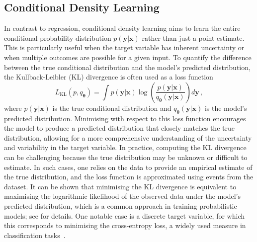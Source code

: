 \subsection{Conditional Density Learning}
\label{sec:conditional_density}
In contrast to regression, conditional density learning aims to learn the entire conditional probability distribution $p(\mathbf{y}|\mathbf{x})$ rather than just a point estimate. This is particularly useful when the target variable has inherent uncertainty or when multiple outcomes are possible for a given input. To quantify the difference between the true conditional distribution and the model's predicted distribution, the Kullback-Leibler (KL) divergence is often used as a loss function~\cite{kl_divergence}
\begin{equation}
    \label{eq:kl_divergence}
    L_{\text{KL}}(p, q_{\boldsymbol{\theta}}) = \int p(\mathbf{y}|\mathbf{x}) \log \left(\frac{p(\mathbf{y}|\mathbf{x})}{q_{\boldsymbol{\theta}}(\mathbf{y}|\mathbf{x})}\right) d\mathbf{y}\,,
\end{equation}
where $p(\mathbf{y}|\mathbf{x})$ is the true conditional distribution and $q_{\boldsymbol{\theta}}(\mathbf{y}|\mathbf{x})$ is the model's predicted distribution. Minimising with respect to this loss function encourages the model to produce a predicted distribution that closely matches the true distribution, allowing for a more comprehensive understanding of the uncertainty and variability in the target variable. In practice, computing the KL divergence can be challenging because the true distribution may be unknown or difficult to estimate. In such cases, one relies on the data to provide an empirical estimate of the true distribution, and the loss function is approximated using events from the dataset. It can be shown that minimising the KL divergence is equivalent to maximising the logarithmic likelihood of the observed data under the model's predicted distribution, which is a common approach in training probabilistic models; see  for details. One notable case is a discrete target variable, for which this corresponds to minimising the cross-entropy loss, a widely used measure in classification tasks~\cite{cross-entropy}.

